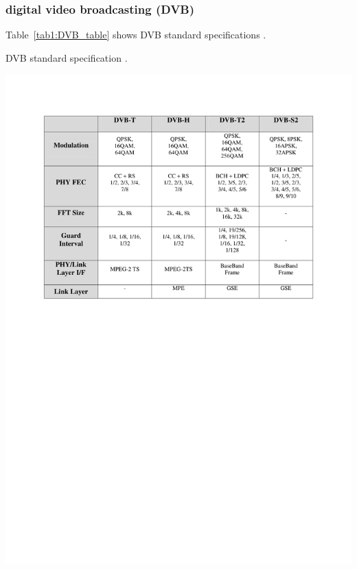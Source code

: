 			\subsubsection{digital video broadcasting (DVB)}
				 Table~\ref{tab1:DVB_table} shows DVB standard specifications \cite{2012-woo}.
				\begin{table}[htb]
					\caption{DVB standard specification \protect \cite{2012-woo}. }
					\includegraphics[width=\textwidth]{./chap_2/DVB_table}
					\label{tab1:DVB_table}		
				\end{table} 
